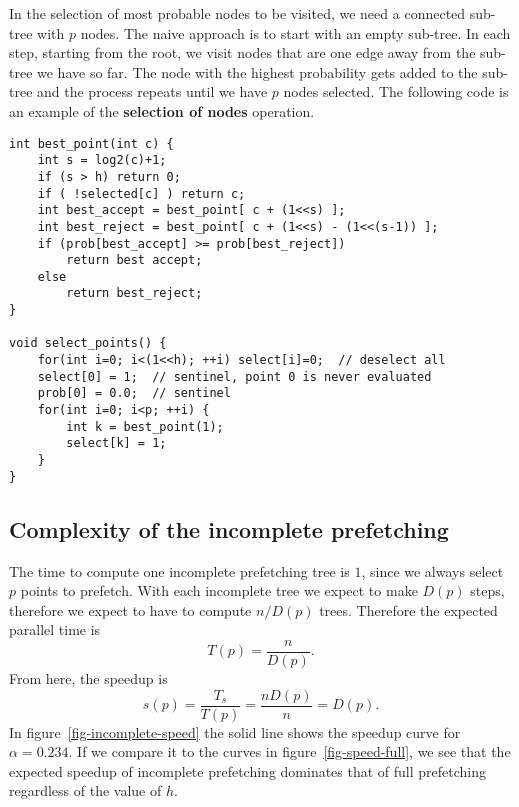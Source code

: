 \documentclass[11pt,letterpaper]{article}       %
\begin{document}
In the selection of most probable nodes to be visited, we need a connected sub-tree with 
$p$ nodes. 
The naive approach is to start with an empty sub-tree.  In each step, starting 
from the root, we visit nodes that are one 
edge away from the sub-tree we have so far. The node with the highest probability 
gets added to the sub-tree and the process repeats until we have $p$ nodes selected.  
The following code is an example of the \textbf{selection of nodes} operation.
\begin{Verbatim}[frame=single]
int best_point(int c) {
    int s = log2(c)+1;
    if (s > h) return 0;
    if ( !selected[c] ) return c;
    int best_accept = best_point[ c + (1<<s) ];
    int best_reject = best_point[ c + (1<<s) - (1<<(s-1)) ];
    if (prob[best_accept] >= prob[best_reject]) 
        return best accept; 
    else 
        return best_reject;
}

void select_points() {
    for(int i=0; i<(1<<h); ++i) select[i]=0;  // deselect all 
    select[0] = 1;  // sentinel, point 0 is never evaluated
    prob[0] = 0.0;  // sentinel 
    for(int i=0; i<p; ++i) {
        int k = best_point(1);
        select[k] = 1;
    }
}
\end{Verbatim}

\subsection{Complexity of the incomplete prefetching}

The time to compute one incomplete prefetching tree is $1$, since we always
select $p$ points to prefetch.
With each incomplete tree we expect to make $D(p)$ steps, therefore we expect 
to have to compute $n/D(p)$ trees.  Therefore the expected parallel time is
\begin{equation}
T(p) = \frac{n}{D(p)}.
\end{equation}
From here, the speedup is 
\begin{equation}
s(p) = \frac{T_s}{T(p)} = \frac{nD(p)}{n} = D(p).
\end{equation}
In figure~\ref{fig-incomplete-speed} the solid line shows the speedup curve for
$\alpha=0.234$.  If we compare it to the curves in figure~\ref{fig-speed-full}, we see that the
expected speedup of incomplete prefetching dominates that of full prefetching 
regardless of the value of $h$.
\end{document}
